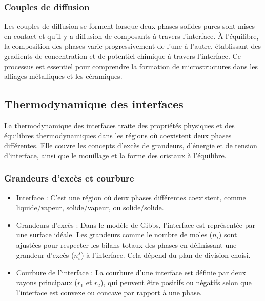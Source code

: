 \documentclass{article}
\begin{document}
        \subsubsection{Couples de diffusion}
        Les couples de diffusion se forment lorsque deux phases solides pures sont mises en contact et qu'il y a diffusion de composants à travers l'interface. À l'équilibre, la composition des phases varie progressivement de l'une à l'autre, établissant des gradients de concentration et de potentiel chimique à travers l'interface. Ce processus est essentiel pour comprendre la formation de microstructures dans les alliages métalliques et les céramiques.

    \pagebreak
    \subsection{Thermodynamique des interfaces}
    La thermodynamique des interfaces traite des propriétés physiques et des équilibres thermodynamiques dans les régions où coexistent deux phases différentes. Elle couvre les concepts d'excès de grandeurs, d'énergie et de tension d'interface, ainsi que le mouillage et la forme des cristaux à l'équilibre.
        \subsubsection{Grandeurs d'excès et courbure}
        \begin{itemize}
            \item Interface : C'est une région où deux phases différentes coexistent, comme liquide/vapeur, solide/vapeur, ou solide/solide.
            \item Grandeurs d'excès : Dans le modèle de Gibbs, l'interface est représentée par une surface idéale. Les grandeurs comme le nombre de moles ($n_i$) sont ajustées pour respecter les bilans totaux des phases en définissant une grandeur d'excès ($n_i^s$) à l'interface. Cela dépend du plan de division choisi.
            \item Courbure de l'interface : La courbure d'une interface est définie par deux rayons principaux ($r_1$ et $r_2$), qui peuvent être positifs ou négatifs selon que l'interface est convexe ou concave par rapport à une phase.
        \end{itemize}
\end{document}

